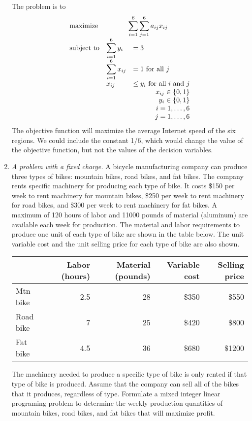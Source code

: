 \begin{enumerate}
\begin{solution}
The problem is to
\[
\begin{array}{lll}
\textrm{maximize} & \multicolumn{2}{c}{\displaystyle\sum_{i=1}^6 \sum_{j=1}^6 a_{ij}x_{ij}} \\
\textrm{subject to} & \displaystyle\sum_{i=1}^6 y_i &= 3  \\
& \displaystyle\sum_{i=1}^{6} x_{ij} &= 1~\text{for all $j$}\\ 
& x_{ij} &\leq y_i~\text{for all $i$ and $j$} \\
& \multicolumn{2}{r}{ x_{ij} \in \{0,1\}} \\
& \multicolumn{2}{r}{ y_i \in \{0,1\}} \\
& \multicolumn{2}{r}{ i = 1,\ldots,6} \\
& \multicolumn{2}{r}{ j = 1,\ldots,6}
\end{array}
\]
The objective function will maximize the average Internet speed of the
six regions. We could include the constant 1/6, which would change the
value of the objective function, but not the values of the decision
variables.
\end{solution}

\item \emph{A problem with a fixed charge.}  A bicycle manufacturing
  company can produce three types of bikes: mountain bikes, road
  bikes, and fat bikes. The company rents specific machinery for
  producing each type of bike. It costs \$150 per week to rent
  machinery for mountain bikes, \$250 per week to rent machinery for
  road bikes, and \$300 per week to rent machinery for fat bikes. A
  maximum of 120 hours of labor and \num{11000} pounds of material
  (aluminum) are available each week for production. The material
  and labor requirements to produce one unit of each type of bike are
  shown in the table below. The unit variable cost and the unit
  selling price for each type of bike are also shown.

\vspace{.1in}
\begin{tabulary}{5.4in}{LRRRR}
& Labor (hours) 
& Material (pounds) 
& Variable cost 
& Selling price \\ \hline
Mtn bike & 2.5 & 28 & \$350 & \$550 \\
Road bike & 7 & 25 & \$420 & \$800 \\
Fat bike & 4.5 & 36 & \$680 & \$\num{1200}
\end{tabulary}
\vspace{.1in}

The machinery needed to produce a specific type of bike is only rented
if that type of bike is produced. Assume that the company can sell all
of the bikes that it produces, regardless of type.  Formulate a mixed
integer linear programing problem to determine the weekly production
quantities of mountain bikes, road bikes, and fat bikes that will
maximize profit.


\end{enumerate}
